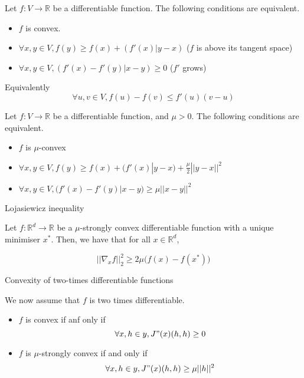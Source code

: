 \documentclass[
10pt, %
a4paper, %
oneside, %
headinclude,footinclude, %
BCOR5mm, %
]{scrartcl}
\begin{document}
\begin{proposition}
    \label{prop:conv}
    Let $f:V \rightarrow \mathbb{R} $ be a differentiable function. The following conditions are equivalent.
    \begin{itemize}
        \item $f$ is convex.
	\item $\forall x, y\in V, f(y)\geq f(x)+(f'(x)|y-x)$ ($f$ is above its tangent space)
	\item $\forall x, y\in V, (f'(x)-f'(y)|x-y)\geq 0$ ($f'$ grows)
    \end{itemize}
\end{proposition}

\begin{remark}
    Equivalently
    \begin{equation*}
	\forall u,v\in V, f(u)-f(v)\leq f'(u)(v-u)
    \end{equation*}
\end{remark}

\begin{proposition}
    \label{prop:alphaconv}
    Let $f:V \rightarrow \mathbb{R} $ be a differentiable function, and $\mu>0$. The following conditions are equivalent.
    \begin{itemize}
        \item $f$ is $ \mu$-convex
	\item $\forall x, y\in V, f(y)\geq f(x)+(f'(x)|y-x)+ \frac{  \mu}{2} ||y-x||^2$
	\item $\forall x, y\in V, (f'(x)-f'(y)|x-y)\geq \mu ||x-y||^2$
    \end{itemize}
\end{proposition}

\begin{lemma}{Lojasiewicz inequality}

    Let $f: \mathbb{R}^d\rightarrow \mathbb{R} $ be a $\mu$-strongly convex differentiable function with a unique minimiser $x^*$. Then, we have that for all $x\in \mathbb{R}^d$, 

    \begin{equation*}
	||\nabla_xf||_2^2\geq 2\mu \big(f(x)-f(x^*)\big)
    \end{equation*}
\end{lemma}

\begin{proposition}{Convexity of two-times differentiable functions}

    We now assume that $f$ is two times differentiable.

    \begin{itemize}
	\item $f$ is convex if anf only if
	    \begin{equation*}
		\forall x, h\in y, J"(x)(h, h)\geq 0
	    \end{equation*}
	\item $f$ is $\mu$-strongly convex if and only if
	    \begin{equation*}
		\forall x, h\in y, J"(x)(h, h)\geq \mu ||h||^2
	    \end{equation*}
    \end{itemize}

\end{proposition}
\end{document}

